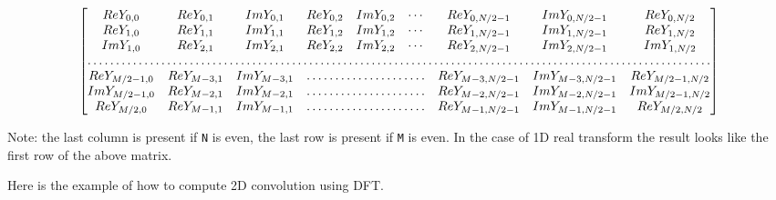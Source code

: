 \[\begin{bmatrix}
Re Y_{0,0} & Re Y_{0,1} & Im Y_{0,1} & Re Y_{0,2} & Im Y_{0,2} & \cdots & Re Y_{0,N/2-1} & Im Y_{0,N/2-1} & Re Y_{0,N/2} \\
Re Y_{1,0} & Re Y_{1,1} & Im Y_{1,1} & Re Y_{1,2} & Im Y_{1,2} & \cdots & Re Y_{1,N/2-1} & Im Y_{1,N/2-1} & Re Y_{1,N/2} \\
Im Y_{1,0} & Re Y_{2,1} & Im Y_{2,1} & Re Y_{2,2} & Im Y_{2,2} & \cdots & Re Y_{2,N/2-1} & Im Y_{2,N/2-1} & Im Y_{1,N/2} \\
\hdotsfor{9} \\
Re Y_{M/2-1,0} &  Re Y_{M-3,1}  & Im Y_{M-3,1} & \hdotsfor{3} & Re Y_{M-3,N/2-1} & Im Y_{M-3,N/2-1}& Re Y_{M/2-1,N/2} \\
Im Y_{M/2-1,0} &  Re Y_{M-2,1}  & Im Y_{M-2,1} & \hdotsfor{3} & Re Y_{M-2,N/2-1} & Im Y_{M-2,N/2-1}& Im Y_{M/2-1,N/2} \\
Re Y_{M/2,0}  &  Re Y_{M-1,1} &  Im Y_{M-1,1} & \hdotsfor{3} & Re Y_{M-1,N/2-1} & Im Y_{M-1,N/2-1}& Re Y_{M/2,N/2}
\end{bmatrix}
\]


Note: the last column is present if \texttt{N} is even, the last row is present if \texttt{M} is even.
In the case of 1D real transform the result looks like the first row of the above matrix.

Here is the example of how to compute 2D convolution using DFT.

